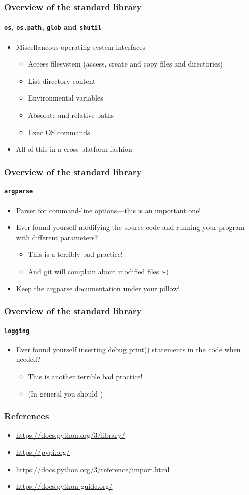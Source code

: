 \documentclass[9pt]{beamer}
\begin{document}
\begin{frame}
  \frametitle{Overview of the standard library}
  \framesubtitle{\texttt{os}, \texttt{os.path}, \texttt{glob} and
    \texttt{shutil}}
  \begin{itemize}
  \item Miscellaneous operating system interfaces
    \begin{itemize}
    \item Access filesystem (access, create and copy files and directories)
    \item List directory content
    \item Environmental variables
    \item Absolute and relative paths
    \item Exec OS commands
    \end{itemize}
  \item \alert{All of this in a cross-platform fashion}
  \end{itemize}
\end{frame}


\begin{frame}
  \frametitle{Overview of the standard library}
  \framesubtitle{\texttt{argparse}}
  \begin{itemize}
  \item \alert{Parser for command-line options---this is an important one!}
  \item Ever found yourself modifying the source code and running your
    program with different parameters?
    \begin{itemize}
    \item This is a terribly bad practice!
    \item And git will complain about modified files :-)
    \end{itemize}
  \item Keep the argparse documentation under your pillow!
  \end{itemize}
\end{frame}


\begin{frame}
  \frametitle{Overview of the standard library}
  \framesubtitle{\texttt{logging}}
  \begin{itemize}
  \item Ever found yourself inserting debug print() statements in the code
    when needed?
    \begin{itemize}
    \item This is another terrible bad practice!
    \item (In general you should )
    \end{itemize}
  \end{itemize}
\end{frame}


\begin{frame}
  \frametitle{References}
  \scriptsize
  \begin{itemize}
  \item \url{https://docs.python.org/3/library/}
  \item \url{https://pypi.org/}
  \item \url{https://docs.python.org/3/reference/import.html}
  \item \url{https://docs.python-guide.org/}
  \end{itemize}
\end{frame}
\end{document}

